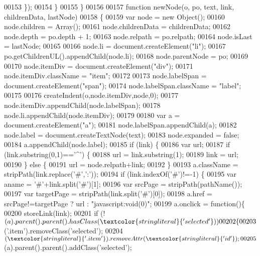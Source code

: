 \begin{DoxyCode}
00153     \});
00154   \}
00155 \}
00156 
00157 \textcolor{keyword}{function} newNode(o, po, text, link, childrenData, lastNode)
00158 \{
00159   var node = \textcolor{keyword}{new} Object();
00160   node.children = Array();
00161   node.childrenData = childrenData;
00162   node.depth = po.depth + 1;
00163   node.relpath = po.relpath;
00164   node.isLast = lastNode;
00165 
00166   node.li = document.createElement(\textcolor{stringliteral}{"li"});
00167   po.getChildrenUL().appendChild(node.li);
00168   node.parentNode = po;
00169 
00170   node.itemDiv = document.createElement(\textcolor{stringliteral}{"div"});
00171   node.itemDiv.className = \textcolor{stringliteral}{"item"};
00172 
00173   node.labelSpan = document.createElement(\textcolor{stringliteral}{"span"});
00174   node.labelSpan.className = \textcolor{stringliteral}{"label"};
00175 
00176   createIndent(o,node.itemDiv,node,0);
00177   node.itemDiv.appendChild(node.labelSpan);
00178   node.li.appendChild(node.itemDiv);
00179 
00180   var a = document.createElement(\textcolor{stringliteral}{"a"});
00181   node.labelSpan.appendChild(a);
00182   node.label = document.createTextNode(text);
00183   node.expanded = \textcolor{keyword}{false};
00184   a.appendChild(node.label);
00185   \textcolor{keywordflow}{if} (link) \{
00186     var url;
00187     \textcolor{keywordflow}{if} (link.substring(0,1)==\textcolor{charliteral}{'^'}) \{
00188       url = link.substring(1);
00189       link = url;
00190     \} \textcolor{keywordflow}{else} \{
00191       url = node.relpath+link;
00192     \}
00193     a.className = stripPath(link.replace(\textcolor{charliteral}{'#'},\textcolor{charliteral}{':'}));
00194     \textcolor{keywordflow}{if} (link.indexOf(\textcolor{charliteral}{'#'})!=-1) \{
00195       var aname = \textcolor{charliteral}{'#'}+link.split(\textcolor{charliteral}{'#'})[1];
00196       var srcPage = stripPath(pathName());
00197       var targetPage = stripPath(link.split(\textcolor{charliteral}{'#'})[0]);
00198       a.href = srcPage!=targetPage ? url : \textcolor{stringliteral}{"javascript:void(0)"}; 
00199       a.onclick = \textcolor{keyword}{function}()\{
00200         storeLink(link);
00201         \textcolor{keywordflow}{if} (!$(a).parent().parent().hasClass(\textcolor{stringliteral}{'selected'}))
00202         \{
00203           $(\textcolor{stringliteral}{'.item'}).removeClass(\textcolor{stringliteral}{'selected'});
00204           $(\textcolor{stringliteral}{'.item'}).removeAttr(\textcolor{stringliteral}{'id'});
00205           $(a).parent().parent().addClass(\textcolor{stringliteral}{'selected'});

\end{DoxyCode}
